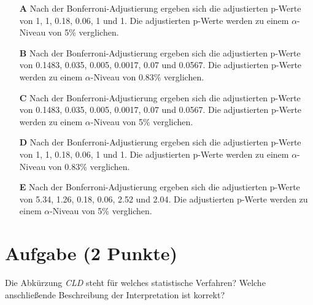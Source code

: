 \documentclass[a4paper, 9pt]{scrartcl}\usepackage[]{graphicx}\usepackage[]{xcolor}
\begin{document}
\begin{enumerate}
\item [\textbf{A} \msquare] Nach der Bonferroni-Adjustierung ergeben sich die adjustierten p-Werte von 1, 1, 0.18, 0.06, 1 und 1. Die adjustierten p-Werte werden zu einem $\alpha$-Niveau von 5\% verglichen.
\item [\textbf{B} \msquare] Nach der Bonferroni-Adjustierung ergeben sich die adjustierten p-Werte von 0.1483, 0.035, 0.005, 0.0017, 0.07 und 0.0567. Die adjustierten p-Werte werden zu einem $\alpha$-Niveau von 0.83\% verglichen.
\item [\textbf{C} \msquare] Nach der Bonferroni-Adjustierung ergeben sich die adjustierten p-Werte von 0.1483, 0.035, 0.005, 0.0017, 0.07 und 0.0567. Die adjustierten p-Werte werden zu einem $\alpha$-Niveau von 5\% verglichen.
\item [\textbf{D} \msquare] Nach der Bonferroni-Adjustierung ergeben sich die adjustierten p-Werte von 1, 1, 0.18, 0.06, 1 und 1. Die adjustierten p-Werte werden zu einem $\alpha$-Niveau von 0.83\% verglichen.
\item [\textbf{E} \msquare] Nach der Bonferroni-Adjustierung ergeben sich die adjustierten p-Werte von 5.34, 1.26, 0.18, 0.06, 2.52 und 2.04. Die adjustierten p-Werte werden zu einem $\alpha$-Niveau von 5\% verglichen.
\end{enumerate}

\section{Aufgabe \hfill (2 Punkte)}

Die Abk{\"u}rzung \textit{CLD} steht f{\"u}r welches statistische Verfahren? Welche
anschlie{\ss}ende Beschreibung der Interpretation ist korrekt? 
\end{document}
